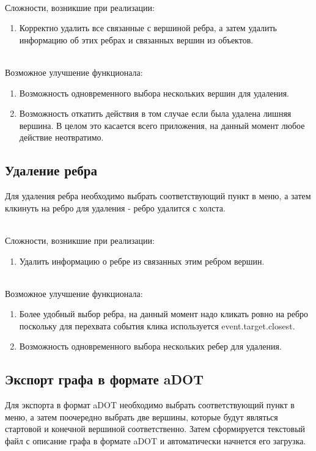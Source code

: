 ~\\Сложности, возникшие при реализации:
\begin{enumerate}
	\item Корректно удалить все связанные с вершиной ребра, а затем удалить информацию об этих ребрах и связанных вершин из объектов.
\end{enumerate}

~\\Возможное улучшение функционала:
\begin{enumerate}
	\item Возможность одновременного выбора нескольких вершин для удаления.
	\item Возможность откатить действия в том случае если была удалена лишняя вершина. В целом это касается всего приложения, на данный момент любое действие неотвратимо.
\end{enumerate}

\subsection{Удаление ребра}
Для удаления ребра необходимо выбрать соответствующий пункт в меню, а затем клкинуть на ребро для удаления - ребро удалится с холста.

~\\Сложности, возникшие при реализации:
\begin{enumerate}
	\item Удалить информацию о ребре из связанных этим ребром вершин.
\end{enumerate}

~\\Возможное улучшение функционала:
\begin{enumerate}
	\item Более удобный выбор ребра, на данный момент надо кликать ровно на ребро поскольку для перехвата события клика используется event.target.closest.
	\item Возможность одновременного выбора нескольких ребер для удаления.
\end{enumerate}

\subsection{Экспорт графа в формате aDOT}
Для экспорта в формат aDOT необходимо выбрать соответствующий пункт в меню, а затем поочередно выбрать две вершины, которые будут являться стартовой и конечной вершиной соответственно. Затем сформируется текстовый файл с описание графа в формате aDOT и автоматически начнется его загрузка.


